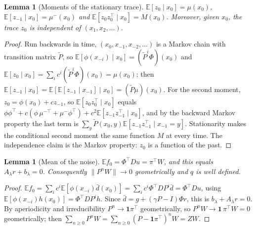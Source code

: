\documentclass[11pt]{article}
\newtheorem{lemma}[theorem]{Lemma}
\theoremstyle{definition}
\theoremstyle{remark}
\newcommand{\E}{\mathbb{E}}
\newcommand{\one}{\mathbf{1}}
\begin{document}
\begin{lemma}[Moments of the stationary trace]\label{lem:trace}
$\E[z_0 \mid x_0] = \mu(x_0)$, $\E[z_{-1}\mid x_0] = \mu^-(x_0)$ and
$\E[z_0z_0^\top\mid x_0] = M(x_0)$. Moreover, given $x_0$, the trace $z_0$ is independent
of $(x_1, x_2, \dots)$.
\end{lemma}
\begin{proof}
Run backwards in time, $(x_0, x_{-1}, x_{-2},\dots)$ is a Markov chain with transition
matrix $\tilde P$, so $\E[\phi(x_{-i})\mid x_0] = (\tilde P^i\Phi)(x_0)$ and
$\E[z_0\mid x_0] = \sum_i c^i(\tilde P^i\Phi)(x_0) = \mu(x_0)$; then
$\E[z_{-1}\mid x_0] = \E[\E[z_{-1}\mid x_{-1}]\mid x_0] = (\tilde P\mu)(x_0)$.
For the second moment, $z_0 = \phi(x_0) + c z_{-1}$, so
$\E[z_0z_0^\top\mid x_0]$ equals
$\phi\phi^\top + c(\phi\,\mu^{-\top} + \mu^-\phi^\top) + c^2\E[z_{-1}z_{-1}^\top\mid x_0]$,
and by the backward Markov property the last term is
$\sum_y\tilde P(x_0,y)\E[z_{-1}z_{-1}^\top\mid x_{-1} = y]$. Stationarity makes the
conditional second moment the same function $M$ at every time. The independence
claim is the Markov property: $z_0$ is a function of the past.
\end{proof}

\begin{lemma}[Mean of the noise]\label{lem:mean}
$\E f_0 = \Phi^\top Du = \pi^\top W$, and this equals $A_\lambda r + b_\lambda = 0$.
Consequently $\|P^nW\| \to 0$ geometrically and $q$ is well defined.
\end{lemma}
\begin{proof}
$\E f_0 = \sum_i c^i\E[\phi(x_{-i})\bar d(x_0)] = \sum_i c^i\Phi^\top DP^i\bar d
= \Phi^\top Du$, using $\E[\phi(x_{-i})h(x_0)] = \Phi^\top DP^ih$. Since
$\bar d = g + (\gamma P - I)\Phi r$, this is $b_\lambda + A_\lambda r = 0$. By aperiodicity
and irreducibility $P^n \to \one\pi^\top$ geometrically, so
$P^nW \to \one\,\pi^\top W = 0$ geometrically; then
$\sum_{n\ge0}P^nW = \sum_{n\ge0}(P - \one\pi^\top)^nW = ZW$.
\end{proof}
\end{document}
